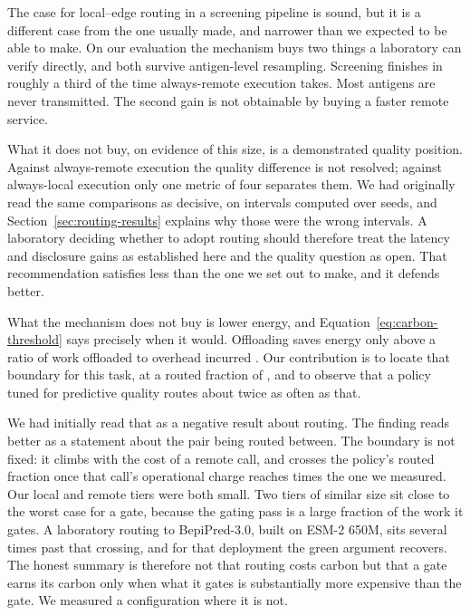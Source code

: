 The case for local--edge routing in a screening pipeline is sound, but it is a
different case from the one usually made, and narrower than we expected to be
able to make. On our evaluation the mechanism buys two things a laboratory can
verify directly, and both survive antigen-level resampling. Screening finishes
in roughly a third of the time always-remote execution takes. Most antigens are
never transmitted. The second gain is not obtainable by buying a faster remote
service.

What it does not buy, on evidence of this size, is a demonstrated quality
position. Against always-remote execution the quality difference is not
resolved; against always-local execution only one metric of four separates
them. We had originally read the same comparisons as decisive, on intervals
computed over seeds, and Section~\ref{sec:routing-results} explains why those
were the wrong intervals. A laboratory deciding whether to adopt routing should
therefore treat the latency and disclosure gains as established here and the
quality question as open. That recommendation satisfies less than the one we
set out to make, and it defends better.

What the mechanism does not buy is lower energy, and
Equation~\ref{eq:carbon-threshold} says precisely when it would. Offloading
saves energy only above a ratio of work offloaded to overhead incurred
\citep{kumar2010cloud}. Our contribution is to locate that boundary for this
task, at a routed fraction of \CarbonBreakEvenRate{}, and to observe that a
policy tuned for predictive quality routes about twice as often as that.

We had initially read that as a negative result about routing. The finding
reads better as a statement about the pair being routed between. The boundary
is not fixed: it climbs with the cost of a remote call, and crosses the
policy's routed fraction once that call's operational charge reaches
\ScaleCrossoverFactor{} times the one we measured. Our local and remote tiers were both small. Two tiers of
similar size sit close to the worst case for a gate, because the gating pass
is a large fraction of the work it gates. A laboratory routing to
BepiPred-3.0, built on ESM-2 650M, sits several times past that crossing, and for
that deployment the green argument recovers. The honest summary is therefore
not that routing costs carbon but that a gate earns its carbon only when what
it gates is substantially more expensive than the gate. We measured a
configuration where it is not.

